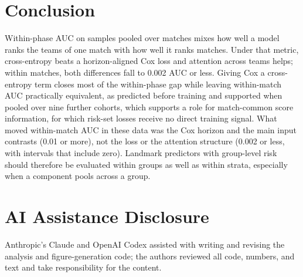 \documentclass[sigconf,anonymous]{acmart}
\begin{document}
\section{Conclusion}
\label{sec:conclusion}
Within-phase AUC on samples pooled over matches mixes how well a model ranks the teams of one match with how well it ranks matches. Under that metric, cross-entropy beats a horizon-aligned Cox loss and attention across teams helps; within matches, both differences fall to 0.002 AUC or less. Giving Cox a cross-entropy term closes most of the within-phase gap while leaving within-match AUC practically equivalent, as predicted before training and supported when pooled over nine further cohorts, which supports a role for match-common score information, for which risk-set losses receive no direct training signal. What moved within-match AUC in these data was the Cox horizon and the main input contrasts (0.01 or more), not the loss or the attention structure (0.002 or less, with intervals that include zero). Landmark predictors with group-level risk should therefore be evaluated within groups as well as within strata, especially when a component pools across a group.

\section*{AI Assistance Disclosure}
Anthropic's Claude and OpenAI Codex assisted with writing and revising the analysis and figure-generation code; the authors reviewed all code, numbers, and text and take responsibility for the content.



\end{document}
